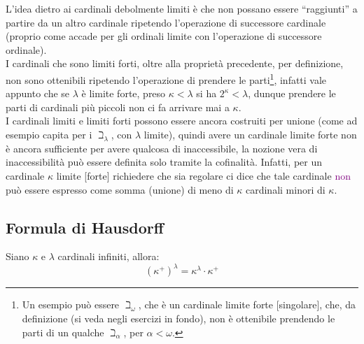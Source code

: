 \begin{remark}
	L'idea dietro ai cardinali debolmente limiti \`e che non possano essere ``raggiunti'' a partire da un altro cardinale ripetendo l'operazione di successore cardinale (proprio come accade per gli ordinali limite con l'operazione di successore ordinale).\\
	I cardinali che sono limiti forti, oltre alla propriet\`a precedente, per definizione, non sono ottenibili ripetendo l'operazione di prendere le parti\footnote{Un esempio pu\`o essere $\beth_\omega$, che \`e un cardinale limite forte [singolare], che, da definizione (si veda negli esercizi in fondo), non \`e ottenibile prendendo le parti di un qualche $\beth_\alpha$, per $\alpha < \omega$.},
	infatti vale appunto che se $\lambda$ \`e limite forte, preso $\kappa < \lambda$ si ha $2^\kappa < \lambda$, dunque prendere le parti di cardinali pi\`u piccoli non ci fa arrivare mai a $\kappa$.\\
	I cardinali limiti e limiti forti possono essere ancora costruiti per unione (come ad esempio capita per i $\beth_\lambda$, con $\lambda$ limite), quindi avere un cardinale limite forte non \`e ancora sufficiente per avere qualcosa di inaccessibile, la nozione vera di inaccessibilit\`a pu\`o essere definita solo tramite la cofinalit\`a. Infatti,
	per un cardinale $\kappa$ limite [forte] richiedere che sia regolare ci dice che tale cardinale \textcolor{purple}{non} pu\`o essere espresso come somma (unione) di meno di $\kappa$ cardinali minori di $\kappa$.
\end{remark}

\pagebreak
\subsection{Formula di Hausdorff}

\begin{proposition}
	Siano $\kappa$ e $\lambda$ cardinali infiniti, allora:
	\[ (\kappa^+)^\lambda = \kappa^{\lambda} \cdot \kappa^+
		\]
\end{proposition}

